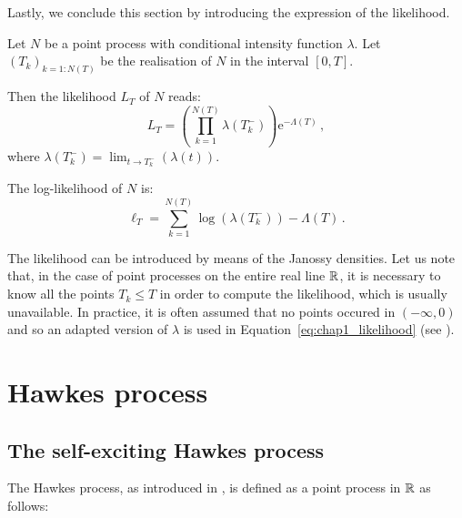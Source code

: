 Lastly, we conclude this section by introducing the expression of the likelihood.

\begin{proposition}{\parencite[Theorem 7.2.III]{DaleyV1}}

    Let $N$ be a point process with conditional intensity function $\lambda$.
    Let $(T_k)_{k=1:N(T)}$ be the realisation of $N$ in the interval $[0, T]$.
    
    Then the likelihood $L_T$ of $N$ reads:
    \begin{equation}\label{eq:chap1_likelihood}
        L_T = \left(\prod_{k=1}^{N(T)}{\lambda(T_k^-)}\right)\mathrm{e}^{-\Lambda(T)}\,,
    \end{equation}
    where $\lambda(T_k^-) = \lim_{t\to T_k^-}(\lambda(t))$.

    The log-likelihood of $N$ is:
    \begin{equation}\label{eq:chap1_loglikelihood}
        \ell_T = \sum_{k=1}^{N(T)}{\log(\lambda(T_k^-))} - \Lambda(T)\,.
    \end{equation}
\end{proposition}
The likelihood can be introduced by means of the Janossy densities.
Let us note that, in the case of point processes on the entire real line ${\mathbb R}$, it is necessary to know all the points $T_k \leq T$ in order to compute the likelihood, which is usually unavailable.
In practice, it is often assumed that no points occured in $(-\infty, 0)$ and so an adapted version of $\lambda$ is used in Equation~\ref{eq:chap1_likelihood} (see \textcite{Ogata1978}).

\section{Hawkes process}\label{sec:chap1_hawkes_process}

\subsection{The self-exciting Hawkes process}

The Hawkes process, as introduced in \textcite{Hawkes1971}, is defined as a point process in ${\mathbb R}$ as follows:

